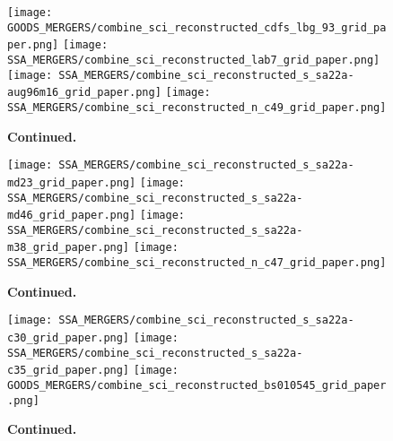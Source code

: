 \documentclass[fleqn,usenatbib]{mn2e}
\begin{document}
\begin{figure*}\ContinuedFloat
    \centering

    \texttt{[image: GOODS\_MERGERS/combine\_sci\_reconstructed\_cdfs\_lbg\_93\_grid\_paper.png]}
    \texttt{[image: SSA\_MERGERS/combine\_sci\_reconstructed\_lab7\_grid\_paper.png]}
    \texttt{[image: SSA\_MERGERS/combine\_sci\_reconstructed\_s\_sa22a-aug96m16\_grid\_paper.png]}
    \texttt{[image: SSA\_MERGERS/combine\_sci\_reconstructed\_n\_c49\_grid\_paper.png]}    

    \caption{\textbf{Continued.}}

\end{figure*}

\begin{figure*}\ContinuedFloat
    \centering

    \texttt{[image: SSA\_MERGERS/combine\_sci\_reconstructed\_s\_sa22a-md23\_grid\_paper.png]}
    \texttt{[image: SSA\_MERGERS/combine\_sci\_reconstructed\_s\_sa22a-md46\_grid\_paper.png]}
    \texttt{[image: SSA\_MERGERS/combine\_sci\_reconstructed\_s\_sa22a-m38\_grid\_paper.png]}    
    \texttt{[image: SSA\_MERGERS/combine\_sci\_reconstructed\_n\_c47\_grid\_paper.png]}

    \caption{\textbf{Continued.}}

\end{figure*}

\begin{figure*}\ContinuedFloat
    \centering

    \texttt{[image: SSA\_MERGERS/combine\_sci\_reconstructed\_s\_sa22a-c30\_grid\_paper.png]}
    \texttt{[image: SSA\_MERGERS/combine\_sci\_reconstructed\_s\_sa22a-c35\_grid\_paper.png]}
    \texttt{[image: GOODS\_MERGERS/combine\_sci\_reconstructed\_bs010545\_grid\_paper.png]}


    \caption{\textbf{Continued.}}

\end{figure*}


\bsp    %
\label{lastpage}
\end{document}
